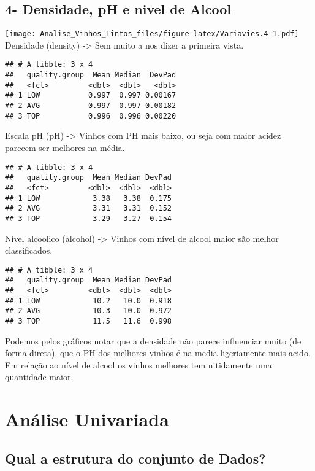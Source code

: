 \documentclass[]{article}
\begin{document}
\hypertarget{densidade-ph-e-nivel-de-alcool}{%
\subsection{4- Densidade, pH e nivel de
Alcool}\label{densidade-ph-e-nivel-de-alcool}}

\texttt{[image: Analise\_Vinhos\_Tintos\_files/figure-latex/Variavies.4-1.pdf]}
Densidade (density) -\textgreater{} Sem muito a nos dizer a primeira
vista.

\begin{verbatim}
## # A tibble: 3 x 4
##   quality.group  Mean Median  DevPad
##   <fct>         <dbl>  <dbl>   <dbl>
## 1 LOW           0.997  0.997 0.00167
## 2 AVG           0.997  0.997 0.00182
## 3 TOP           0.996  0.996 0.00220
\end{verbatim}

Escala pH (pH) -\textgreater{} Vinhos com PH mais baixo, ou seja com
maior acidez parecem ser melhores na média.

\begin{verbatim}
## # A tibble: 3 x 4
##   quality.group  Mean Median DevPad
##   <fct>         <dbl>  <dbl>  <dbl>
## 1 LOW            3.38   3.38  0.175
## 2 AVG            3.31   3.31  0.152
## 3 TOP            3.29   3.27  0.154
\end{verbatim}

Nível alcoolico (alcohol) -\textgreater{} Vinhos com nível de alcool
maior são melhor classificados.

\begin{verbatim}
## # A tibble: 3 x 4
##   quality.group  Mean Median DevPad
##   <fct>         <dbl>  <dbl>  <dbl>
## 1 LOW            10.2   10.0  0.918
## 2 AVG            10.3   10.0  0.972
## 3 TOP            11.5   11.6  0.998
\end{verbatim}

Podemos pelos gráficos notar que a densidade não parece influenciar
muito (de forma direta), que o PH dos melhores vinhos é na media
ligeriamente mais acido. Em relação ao nível de alcool os vinhos
melhores tem nitidamente uma quantidade maior.

\hypertarget{analise-univariada}{%
\section{Análise Univariada}\label{analise-univariada}}

\hypertarget{qual-a-estrutura-do-conjunto-de-dados}{%
\subsection{Qual a estrutura do conjunto de
Dados?}\label{qual-a-estrutura-do-conjunto-de-dados}}
\end{document}
